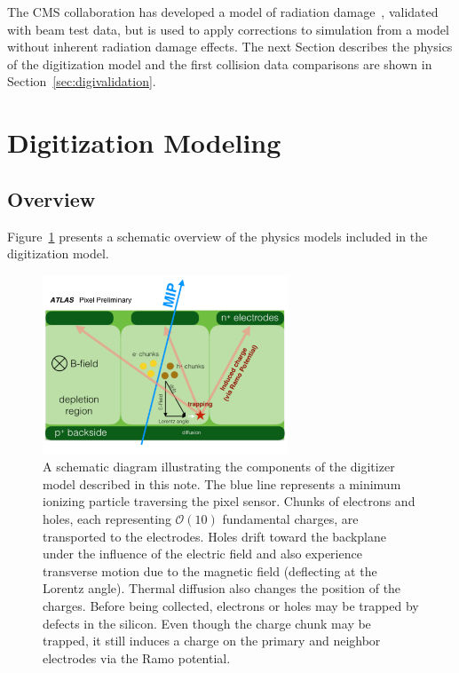   



The CMS collaboration has developed a model of radiation 
damage~\cite{Contardo:2020886,Swartz2002,Chiochia:2004qh,Swartz:2005vp}, validated with beam test data, but is used to apply corrections to simulation from a model without inherent radiation damage effects.  The next Section describes the physics of the digitization model and the first collision data comparisons are shown in Section~\ref{sec:digivalidation}.


\section{Digitization Modeling}
\label{sec:fullmodel}

\subsection{Overview}

Figure~\ref{fig:app:raddamge1} presents a schematic overview of the physics models included in the digitization model.   
\begin{figure}[htpb!]
\centering
\includegraphics[width=0.65\textwidth]{NewDigitizerSchematic.pdf}
\caption{A schematic diagram illustrating the components of the digitizer model described in this note.  The blue line represents a minimum ionizing particle traversing the pixel sensor.  Chunks of electrons and holes, each representing $\mathcal{O}(10)$ fundamental charges, are transported to the electrodes.  Holes drift toward the backplane under the influence of the electric field and also experience transverse motion due to the magnetic field (deflecting at the Lorentz angle).  Thermal diffusion also changes the position of the charges.  Before being collected, electrons or holes may be trapped by defects in the silicon.  Even though the charge chunk may be trapped, it still induces a charge on the primary and neighbor electrodes via the Ramo potential.  }
\label{fig:app:raddamge1}
\end{figure}

